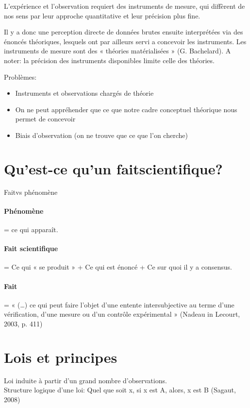 \documentclass{report}
\begin{document}
	L'expérience et l'observation requiert des instruments de mesure, qui diffèrent de nos sens par leur approche quantitative et leur précision plus fine.
	
	Il y a donc une perception directe de données brutes ensuite interprétées via des énoncés théoriques, lesquels ont par ailleurs servi a concevoir les instruments. Les instruments de mesure sont des « théories matérialisées » (G. Bachelard). A noter: la précision des instruments disponibles limite celle des théories.
	
	Problèmes:
	\begin{itemize}
		\item Instruments et observations chargés de théorie
		\item On ne peut appréhender que ce que notre cadre conceptuel théorique nous permet de concevoir
		\item Biais d’observation (on ne trouve que ce que l’on cherche)
	\end{itemize}
	
	\section{Qu'est-ce qu'un \og fait\fg scientifique?}
	
	\og Fait\fg vs phénomène
	\paragraph{Phénomène} = ce qui apparaît.
	\paragraph{Fait scientifique} = Ce qui « se produit » + Ce qui est énoncé + Ce sur quoi il y a consensus.
	
	\paragraph{Fait} = « (…) ce qui peut faire l’objet d’une entente intersubjective au terme d’une vérification, d’une mesure ou d’un contrôle expérimental » (Nadeau in Lecourt, 2003, p. 411)
	
	\section{Lois et principes}
	
	Loi induite à partir d’un grand nombre d’observations.\\
	Structure logique d’une loi: Quel que soit x, si x est A, alors, x est B (Sagaut, 2008)
	
\end{document}
